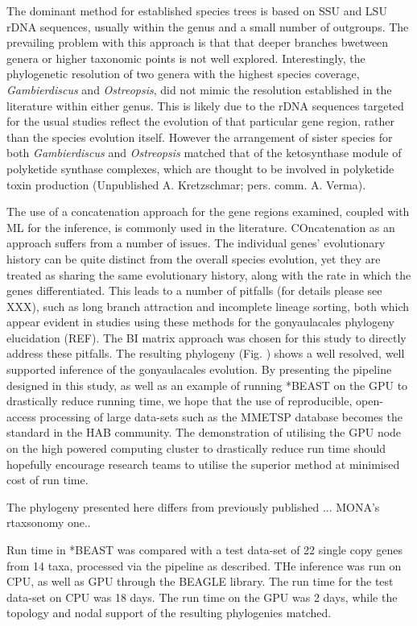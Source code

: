 \documentclass[12pt]{article}
\begin{document}
The dominant method for established species trees is based on SSU and LSU rDNA sequences, usually within the genus and a small number of outgroups. The prevailing problem with this approach is that that deeper branches bwetween genera or higher taxonomic points is not well explored. Interestingly, the phylogenetic resolution of two genera with the highest species coverage, \emph{Gambierdiscus} and \emph{Ostreopsis}, did not mimic the resolution established in the literature within either genus. This is likely due to the rDNA sequences targeted for the usual studies reflect the evolution of that particular gene region, rather than the species evolution itself. However the arrangement of sister species for both \emph{Gambierdiscus} and \emph{Ostreopsis} matched that of the ketosynthase module of polyketide synthase complexes, which are thought to be involved in polyketide toxin production (Unpublished A. Kretzschmar; pers. comm. A. Verma). 

The use of a concatenation approach for the gene regions examined, coupled with ML for the inference, is commonly used in the literature. COncatenation as an approach suffers from a number of issues. The individual genes' evolutionary history can be quite distinct from the overall species evolution, yet they are treated as sharing the same evolutionary history, along with the rate in which the genes differentiated. This leads to a number of pitfalls (for details please see XXX), such as long branch attraction and incomplete lineage sorting, both which appear evident in studies using these methods for the gonyaulacales phylogeny elucidation (REF).
The BI matrix approach was chosen for this study to directly address these pitfalls. The resulting phylogeny (Fig. ) shows a well resolved, well supported inference of the gonyaulacales evolution. By presenting the pipeline designed in this study, as well as an example of running *BEAST on the GPU to drastically reduce running time, we hope that the use of reproducible, open-access processing of large data-sets such as the MMETSP database becomes the standard in the HAB community. The demonstration of utilising the GPU node on the high powered computing cluster to drastically reduce run time should hopefully encourage research teams to utilise the superior method at minimised cost of run time. 

The phylogeny presented here differs from previously published ... MONA's rtaxsonomy one..

Run time in *BEAST was compared with a test data-set of 22 single copy genes from 14 taxa, processed via the pipeline as described. THe inference was run on CPU, as well as GPU through the BEAGLE library.
The run time for the test data-set on CPU was 18 days. The run time on the GPU was 2 days, while the topology and nodal support of the resulting phylogenies matched.
\end{document}
